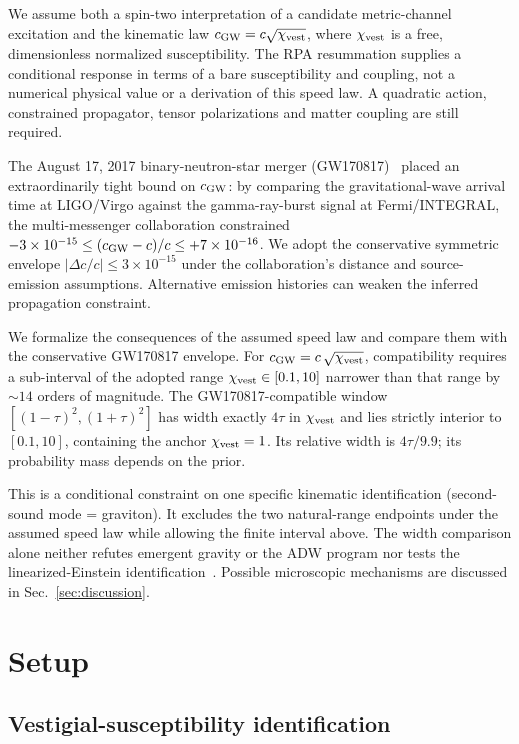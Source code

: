 \documentclass[aps,prd,twocolumn,showpacs,superscriptaddress,nofootinbib]{revtex4-2}
\newcommand{\cGW}{c_{\rm GW}}
\newcommand{\chivest}{\chi_{\rm vest}}
\newcommand{\dccap}{\Delta c/c}
\begin{document}
We assume both a spin-two interpretation of a candidate
metric-channel excitation and the kinematic law
$\cGW=c\sqrt{\chivest}$, where $\chivest$ is a free,
dimensionless normalized susceptibility. The RPA resummation
supplies a conditional response in terms of a bare susceptibility
and coupling, not a numerical physical value or a derivation of
this speed law. A quadratic action, constrained propagator,
tensor polarizations and matter coupling are still required.

The August 17, 2017 binary-neutron-star merger
(GW170817)~\cite{Abbott2017GW170817} placed an extraordinarily
tight bound on $\cGW$: by comparing the gravitational-wave arrival
time at LIGO/Virgo against the gamma-ray-burst signal at
Fermi/INTEGRAL, the multi-messenger collaboration constrained
$-3 \times 10^{-15} \leq (\cGW - c)/c \leq +7 \times 10^{-16}$.
We adopt the conservative symmetric envelope
$|\dccap| \leq 3 \times 10^{-15}$ under the collaboration's
distance and source-emission assumptions. Alternative emission histories
can weaken the inferred propagation constraint.

We formalize the consequences of the assumed speed law and
compare them with the conservative GW170817 envelope. For
$\cGW = c\,\sqrt{\chivest}$, compatibility requires a sub-interval of the adopted range $\chivest \in [0.1, 10]$
narrower than that range by $\sim 14$ orders
of magnitude. The GW170817-compatible window
$[(1-\tau)^{2}, (1+\tau)^{2}]$ has width exactly $4\tau$ in
$\chivest$ and lies strictly interior to $[0.1,10]$, containing the
anchor $\chivest=1$. Its relative width is $4\tau/9.9$; its
probability mass depends on the prior.

This is a conditional constraint on one specific kinematic
identification (second-sound mode = graviton). It excludes the two
natural-range endpoints under the assumed speed law while allowing
the finite interval above. The width comparison alone neither
refutes emergent gravity or the ADW program nor tests the
linearized-Einstein identification~\cite{Roehm2026LinearizedEFE}. Possible microscopic mechanisms are discussed in
Sec.~\ref{sec:discussion}.

\section{Setup}
\label{sec:setup}

\subsection{Vestigial-susceptibility identification}
\end{document}
